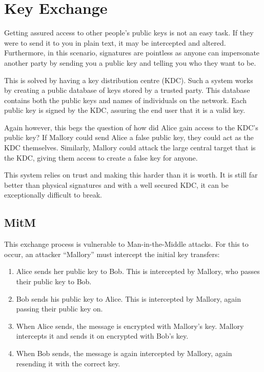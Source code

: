 	\section{Key Exchange}
		Getting assured access to other people's public keys is not an easy task. 
		If they were to send it to you in plain text, it may be intercepted and altered. 
		Furthermore, in this scenario, signatures are pointless as anyone can impersonate another party by sending you a public key and telling you who they want to be. 

		This is solved by having a key distribution centre (KDC). 
		Such a system works by creating a public database of keys stored by a trusted party.
		This database contains both the public keys and names of individuals on the network. 
		Each public key is signed by the KDC, assuring the end user that it is a valid key. 

		Again however, this begs the question of how did Alice gain access to the KDC's public key?
		If Mallory could send Alice a false public key, they could act as the KDC themselves. 
		Similarly, Mallory could attack the large central target that is the KDC, giving them access to create a false key for anyone. 

		This system relies on trust and making this harder than it is worth. 
		It is still far better than physical signatures and with a well secured KDC, it can be exceptionally difficult to break. 

		\subsection{MitM}
			This exchange process is vulnerable to Man-in-the-Middle attacks. 
			For this to occur, an attacker ``Mallory'' must intercept the initial key transfers:
			\begin{enumerate}
				\item Alice sends her public key to Bob. This is intercepted by Mallory, who passes their public key to Bob. 
				\item Bob sends his public key to Alice. This is intercepted by Mallory, again passing their public key on. 
				\item When Alice sends, the message is encrypted with Mallory's key. 
					Mallory intercepts it and sends it on encrypted with Bob's key. 
				\item When Bob sends, the message is again intercepted by Mallory, again resending it with the correct key. 
			\end{enumerate}

